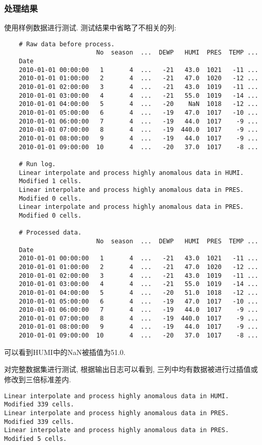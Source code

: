 \subsubsection{处理结果}
使用样例数据进行测试. 测试结果中省略了不相关的列:
\begin{lstlisting}
    # Raw data before process.
                         No  season  ...  DEWP   HUMI  PRES  TEMP ...
    Date
    2010-01-01 00:00:00   1       4  ...   -21   43.0  1021   -11 ...
    2010-01-01 01:00:00   2       4  ...   -21   47.0  1020   -12 ...
    2010-01-01 02:00:00   3       4  ...   -21   43.0  1019   -11 ...
    2010-01-01 03:00:00   4       4  ...   -21   55.0  1019   -14 ...
    2010-01-01 04:00:00   5       4  ...   -20    NaN  1018   -12 ...
    2010-01-01 05:00:00   6       4  ...   -19   47.0  1017   -10 ...
    2010-01-01 06:00:00   7       4  ...   -19   44.0  1017    -9 ...
    2010-01-01 07:00:00   8       4  ...   -19  440.0  1017    -9 ...
    2010-01-01 08:00:00   9       4  ...   -19   44.0  1017    -9 ...
    2010-01-01 09:00:00  10       4  ...   -20   37.0  1017    -8 ...

    # Run log.
    Linear interpolate and process highly anomalous data in HUMI.
    Modified 1 cells.
    Linear interpolate and process highly anomalous data in PRES.
    Modified 0 cells.
    Linear interpolate and process highly anomalous data in PRES.
    Modified 0 cells.

    # Processed data.
                         No  season  ...  DEWP   HUMI  PRES  TEMP ...
    Date
    2010-01-01 00:00:00   1       4  ...   -21   43.0  1021   -11 ...
    2010-01-01 01:00:00   2       4  ...   -21   47.0  1020   -12 ...
    2010-01-01 02:00:00   3       4  ...   -21   43.0  1019   -11 ...
    2010-01-01 03:00:00   4       4  ...   -21   55.0  1019   -14 ...
    2010-01-01 04:00:00   5       4  ...   -20   51.0  1018   -12 ...
    2010-01-01 05:00:00   6       4  ...   -19   47.0  1017   -10 ...
    2010-01-01 06:00:00   7       4  ...   -19   44.0  1017    -9 ...
    2010-01-01 07:00:00   8       4  ...   -19  440.0  1017    -9 ...
    2010-01-01 08:00:00   9       4  ...   -19   44.0  1017    -9 ...
    2010-01-01 09:00:00  10       4  ...   -20   37.0  1017    -8 ...
\end{lstlisting}
可以看到HUMI中的NaN被插值为51.0.

对完整数据集进行测试, 根据输出日志可以看到, 三列中均有数据被进行过插值或修改到三倍标准差内.
\begin{lstlisting}
Linear interpolate and process highly anomalous data in HUMI.
Modified 339 cells.
Linear interpolate and process highly anomalous data in PRES.
Modified 339 cells.
Linear interpolate and process highly anomalous data in PRES.
Modified 5 cells.
\end{lstlisting}